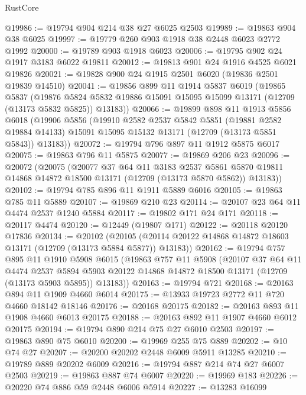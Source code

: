 \begin{lexlean}{RustCore}
\begin{coremodule}
@19986 := @19794 @904 @214 @38 @27 @6025 @2503
@19989 := @19863 @904 @38 @6025
@19997 := @19779 @260 @903 @1918 @38 @2448 @6023 @2772 @1992
@20000 := @19789 @903 @1918 @6023
@20006 := @19795 @902 @24 @1917 @3183 @6022 @19811
@20012 := @19813 @901 @24 @1916 @4525 @6021 @19826
@20021 := @19828 @900 @24 @1915 @2501 @6020 (@19836 @2501 @19839 @14510)
@20041 := @19856
    @899
    @11
    @1914
    @5837
    @6019
    (@19865
      @5837
      (@19876 @5824 @5832 @19886 @15091 @15095 @15099 @13171 (@12709 (@13173 @5832 @5825)) @13183))
@20066 := @19899
    @898
    @11
    @1913
    @5856
    @6018
    (@19906
      @5856
      (@19910
        @2582
        @2537
        @5842
        @5851
        (@19881 @2582 @19884 @14133)
        @15091
        @15095
        @15132
        @13171
        (@12709 (@13173 @5851 @5843))
        @13183))
@20072 := @19794 @796 @897 @11 @1912 @5875 @6017
@20075 := @19863 @796 @11 @5875
@20077 := @19869 @206 @23
@20096 := @20072
    (@20075
      (@20077
        @37
        @64
        @11
        @3183
        @2537
        @5861
        @5870
        @19811
        @14868
        @14872
        @18500
        @13171
        (@12709 (@13173 @5870 @5862))
        @13183))
@20102 := @19794 @785 @896 @11 @1911 @5889 @6016
@20105 := @19863 @785 @11 @5889
@20107 := @19869 @210 @23
@20114 := @20107 @23 @64 @11 @4474 @2537 @1240 @5884
@20117 := @19802 @171 @24 @171
@20118 := @20117 @4474
@20120 := @12449 (@19807 @171)
@20122 := @20118 @20120 @17836
@20134 := @20102
    (@20105 (@20114 @20122 @14868 @14872 @18603 @13171 (@12709 (@13173 @5884 @5877)) @13183))
@20162 := @19794
    @757
    @895
    @11
    @1910
    @5908
    @6015
    (@19863
      @757
      @11
      @5908
      (@20107
        @37
        @64
        @11
        @4474
        @2537
        @5894
        @5903
        @20122
        @14868
        @14872
        @18500
        @13171
        (@12709 (@13173 @5903 @5895))
        @13183))
@20163 := @19794 @721
@20168 := @20163 @894 @11 @1909 @4660 @6014
@20175 := @13933 @19723 @2772 @11 @720 @4660 @18142 @18146
@20176 := @20168 @20175
@20182 := @20163 @893 @11 @1908 @4660 @6013 @20175
@20188 := @20163 @892 @11 @1907 @4660 @6012 @20175
@20194 := @19794 @890 @214 @75 @27 @6010 @2503
@20197 := @19863 @890 @75 @6010
@20200 := @19969 @255 @75 @889
@20202 := @10 @74 @27
@20207 := @20200 @20202 @2448 @6009 @5911 @13285
@20210 := @19789 @889 @20202 @6009
@20216 := @19794 @887 @214 @74 @27 @6007 @2503
@20219 := @19863 @887 @74 @6007
@20220 := @19969 @183
@20226 := @20220 @74 @886 @59 @2448 @6006 @5914
@20227 := @13283 @16099

\end{coremodule}
\end{lexlean}
